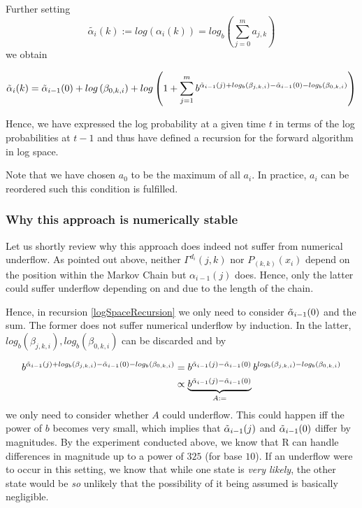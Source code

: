 Further setting 
\[
\tilde{\alpha_i}(k) := log \left( \alpha_i(k) \right) =  
log_b\left( \sum_{j=0}^m a_{j, k} \right)
\]
we obtain

\begin{align}
\tilde{\alpha}_{i}(k) = \tilde{\alpha}_{i-1}(0) + log \left(\beta_{0, k, i}\right) 
+ log \left( 1 + \sum_{j=1}^m b^{
	\tilde{\alpha}_{i-1}(j) + log_b( \beta_{j, k, i}) - \tilde{\alpha}_{i-1}(0) - log_b(\beta_{0, k, i})		
}
\right)
\label{logSpaceRecursion}
\end{align}

Hence, we have expressed the log probability at a given time $t$ in terms of the log probabilities at $t-1$ and thus have defined a recursion for the forward algorithm in log space. 

Note that we have chosen $a_0$ to be the maximum of all $a_i$. In practice, $a_i$ can be reordered such this condition is fulfilled. 

\subsubsection*{Why this approach is numerically stable}
Let us shortly review why this approach does indeed not suffer from numerical underflow. 
As pointed out above, neither $\Gamma^{d_i}(j,k)$ nor $ P_{(k, k)}(x_i)$ depend on the position within the Markov Chain but $\alpha_{i-1}(j)$ does. Hence, only the latter could suffer underflow depending on and due to the length of the chain.

Hence, in recursion \ref{logSpaceRecursion} we only need to consider $\tilde{\alpha}_{i-1}(0)$ and the sum. The former does not suffer numerical underflow by induction. In the latter, $log_b\left(\beta_{j, k, i}\right), log_b\left(\beta_{0, k, i}\right)$ can be discarded and by 

\begin{align*}
	 b^{
		\tilde{\alpha}_{i-1}(j) + log_b( \beta_{j, k, i}) - \tilde{\alpha}_{i-1}(0) - log_b(\beta_{0, k, i})}	 
	 &= 
		b^{
			\tilde{\alpha}_{i-1}(j) - \tilde{\alpha}_{i-1}(0)
		}
	\, 
		b^{
			log_b\left( \beta_{j, k, i}\right) - 
			log_b\left(\beta_{0, k, i}\right)
		}\\
	&\propto
	\underbrace{
	b^{
		\tilde{\alpha}_{i-1}(j) - \tilde{\alpha}_{i-1}(0)
	}}_{A:=}
\end{align*}
we only need to consider whether $A$ could underflow. This could happen iff the power of $b$ becomes very small, which implies that $\tilde{\alpha}_{i-1}(j)$ and $\tilde{\alpha}_{i-1}(0)$ differ by magnitudes. By the experiment conducted above, we know that R can handle differences in magnitude up to a power of $325$ (for base $10$). If an underflow were to occur in this setting, we know that while one state is \textit{very likely}, the other state would be \textit{so} unlikely that the possibility of it being assumed is basically negligible. 

